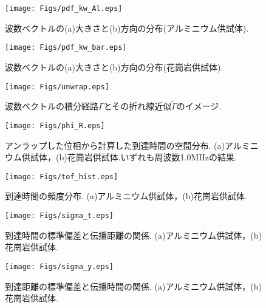 \begin{figure}
\begin{center}
	\texttt{[image: Figs/pdf\_kw\_Al.eps]}
	\caption{波数ベクトルの(a)大きさと(b)方向の分布(アルミニウム供試体).}
	\label{fig:fig8}
\end{center}
\end{figure}
\begin{figure}
\begin{center}
	\texttt{[image: Figs/pdf\_kw\_bar.eps]}
	\caption{波数ベクトルの(a)大きさと(b)方向の分布(花崗岩供試体).}
	\label{fig:fig9}
\end{center}
\end{figure}
\begin{figure}
\begin{center}
	\texttt{[image: Figs/unwrap.eps]}
	\caption{波数ベクトルの積分経路$\Gamma$とその折れ線近似$\tilde \Gamma$のイメージ.}
	\label{fig:fig12}
\end{center}
\end{figure}
\begin{figure}
\begin{center}
	\texttt{[image: Figs/phi\_R.eps]}
	\caption{アンラップした位相から計算した到達時間の空間分布. (a)アルミニウム供試体，(b)花崗岩供試体.いずれも周波数1.0MHzの結果.}
	\label{fig:fig10}
\end{center}
\end{figure}
\begin{figure}
\begin{center}
	\texttt{[image: Figs/tof\_hist.eps]}
	\caption{到達時間の頻度分布. (a)アルミニウム供試体，(b)花崗岩供試体.}
	\label{fig:fig11}
\end{center}
\end{figure}
\begin{figure}
\begin{center}
	\texttt{[image: Figs/sigma\_t.eps]}
	\caption{到達時間の標準偏差と伝播距離の関係. (a)アルミニウム供試体，(b)花崗岩供試体.}
	\label{fig:fig11}
\end{center}
\end{figure}
\begin{figure}
\begin{center}
	\texttt{[image: Figs/sigma\_y.eps]}
	\caption{到達距離の標準偏差と伝播時間の関係. (a)アルミニウム供試体，(b)花崗岩供試体.}
	\label{fig:fig11}
\end{center}
\end{figure}
